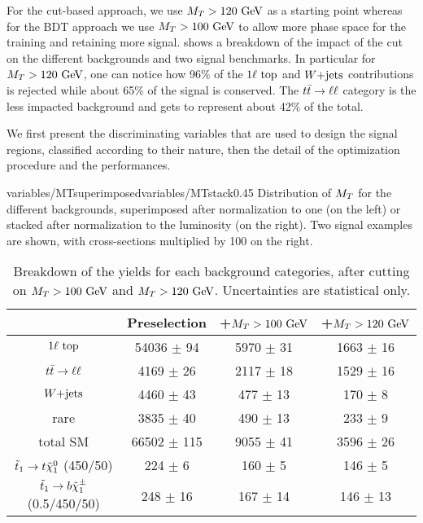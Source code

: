     For the cut-based approach, we use $M_T > 120 ~\text{GeV}$ as a starting point
    whereas for the BDT approach we use $M_T > 100 ~\text{GeV}$ to allow more phase space for the
    training and retaining more signal.  shows a breakdown of
    the impact of the cut on the different backgrounds and two signal benchmarks.
    In particular for $M_T > 120~\text{GeV}$, one can notice how 96\% of the $1\ell~\text{top}$ and
    $\text{$W$+jets}$ contributions is rejected while about 65\% of the signal is conserved. The
    $t\bar{t} \rightarrow \ell \ell$ category is the less impacted background and gets to represent about
    42\% of the total.

    We first present the discriminating variables that are used to design the signal regions, classified
    according to their nature, then the detail of the optimization procedure and the performances.

                     {variables/MTsuperimposed}{variables/MTstack}{0.45}
                     {Distribution of $M_T$ for the different backgrounds,
                     superimposed after normalization to one (on the left) or
                     stacked after normalization to the luminosity (on the right).
                     Two signal examples are shown, with cross-sections multiplied by 100
                     on the right.}

    \begin{table}[h!]
        \centering
        \begin{tabular}{|c|ccc|}
            \hline
                          & Preselection       & +$M_T > 100 ~\text{GeV}$   & +$M_T > 120 ~\text{GeV}$     \\
            \hline
        $1\ell~\text{top}$   & 54036 $\pm$ 94     &  5970 $\pm$ 31      &  1663 $\pm$ 16       \\
        $t\bar{t} \rightarrow \ell \ell$    &  4169 $\pm$ 26     &  2117 $\pm$ 18      &  1529 $\pm$ 16       \\
        $\text{$W$+jets}$          &  4460 $\pm$ 43     &   477 $\pm$ 13      &   170 $\pm$ 8        \\
        rare              &  3835 $\pm$ 40     &   490 $\pm$ 13      &   233 $\pm$ 9        \\
            \hline
        total SM          & 66502 $\pm$ 115    &  9055 $\pm$ 41      &  3596 $\pm$ 26       \\
            \hline
$\tilde{t}_1 \rightarrow t \tilde{\chi}_1^0$   (450/50) & 224 $\pm$ 6         & 160 $\pm$ 5   & 146 $\pm$ 5   \\
$\tilde{t}_1 \rightarrow b \tilde{\chi}_1^\pm$ (0.5/450/50) & 248 $\pm$ 16        & 167 $\pm$ 14  & 146 $\pm$ 13  \\
            \hline
        \end{tabular}
        \caption{Breakdown of the yields for each background categories, after cutting on
        $M_T > 100 ~\text{GeV}$ and $M_T > 120 ~\text{GeV}$. Uncertainties are statistical only.}
        \label{tab:MTcutImpact}
    \end{table}

